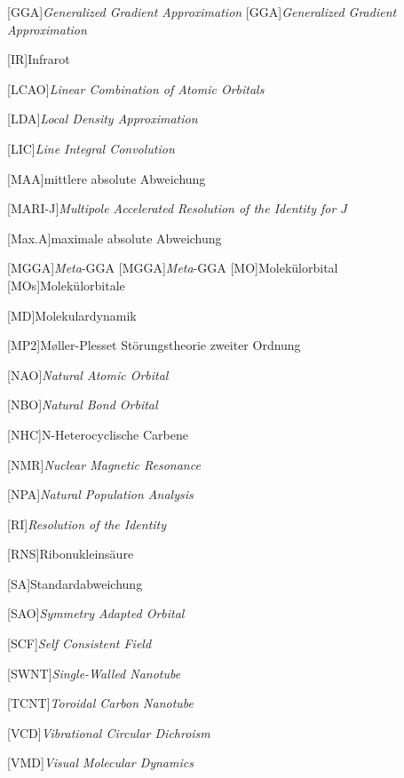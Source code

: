 \begin{acronym}[SEPSEP]
	[GGA]{\textit{Generalized Gradient Approximation}}   
		[GGA]{\textit{Generalized Gradient Approximation}}
	
	[IR]{Infrarot}
		
	[LCAO]{\textit{Linear Combination of Atomic Orbitals}}
	
	[LDA]{\textit{Local Density Approximation}}
	
	[LIC]{\textit{Line Integral Convolution}}
	
	[MAA]{mittlere absolute Abweichung}
     
    [MARI-J]{\textit{Multipole Accelerated Resolution of the Identity for $J$}}
    
    [Max.A]{maximale absolute Abweichung} 	
 	
	[MGGA]{\textit{Meta}-GGA}   
		{\textit{Meta}-GGA}	
	[MO]{Molekülorbital}   
		[MOs]{Molekülorbitale}
		
	[MD]{Molekulardynamik}
	
	[MP2]{M\o ller-Plesset Störungstheorie zweiter Ordnung}
		
    [NAO]{\textit{Natural Atomic Orbital}}

    [NBO]{\textit{Natural Bond Orbital}}
    
    [NHC]{N-Heterocyclische Carbene}
    
    [NMR]{\textit{Nuclear Magnetic Resonance}}
        
    [NPA]{\textit{Natural Population Analysis}}
      
    [RI]{\textit{Resolution of the Identity}}
    
    [RNS]{Ribonukleinsäure}
    
    [SA]{Standardabweichung}
    
    [SAO]{\textit{Symmetry Adapted Orbital}}
    
	[SCF]{\textit{Self Consistent Field}}  
	
	[SWNT]{\textit{Single-Walled Nanotube}}
		
	[TCNT]{\textit{Toroidal Carbon Nanotube}} 
		
	[VCD]{\textit{Vibrational Circular Dichroism}}
     
    [VMD]{\textit{Visual Molecular Dynamics}}
\end{acronym}